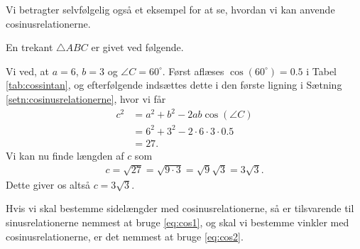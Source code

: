 Vi betragter selvfølgelig også et eksempel for at se, hvordan vi kan anvende cosinusrelationerne. 
\begin{exa}
	En trekant $\triangle ABC$ er givet ved følgende.
	\begin{center}
	\end{center}
	Vi ved, at $a = 6$, $b = 3$ og $\angle C = 60^\circ$. Først aflæses $\cos(60^\circ) = 0.5$ i 
	Tabel \ref{tab:cossintan}, og efterfølgende indsættes dette i den første ligning i
	 Sætning \ref{setn:cosinusrelationerne}, hvor vi får
	\begin{align*}
		c^2 &= a^2 + b^2 -2ab\cos(\angle C) \\
		&= 6^2 + 3^2 - 2\cdot 6\cdot 3 \cdot 0.5 \\
		&= 27.
	\end{align*}
	Vi kan nu finde længden af $c$ som
	\begin{align*}
		c = \sqrt{27} = \sqrt{9\cdot 3} = \sqrt{9}\sqrt{3} = 3\sqrt{3}.
	\end{align*}
	Dette giver os altså $c = 3\sqrt{3}$. 
\end{exa} 

Hvis vi skal bestemme sidelængder med cosinusrelationerne, så er tilsvarende til sinusrelationerne nemmest at bruge \eqref{eq:cos1}, og skal vi bestemme vinkler med cosinusrelationerne, er det nemmest at bruge \eqref{eq:cos2}.

